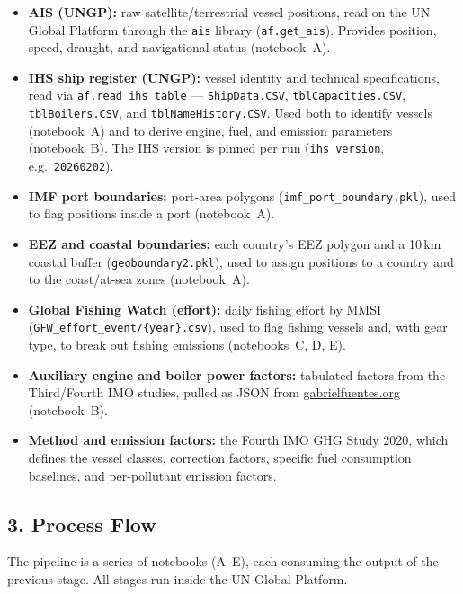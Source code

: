 \documentclass[
  11pt,
]{article}
\providecommand{\tightlist}{%
  \setlength{\itemsep}{0pt}\setlength{\parskip}{0pt}}
\begin{document}
\begin{itemize}
\tightlist
\item
  \textbf{AIS (UNGP):} raw satellite/terrestrial vessel positions, read
  on the UN Global Platform through the \texttt{ais} library
  (\texttt{af.get\_ais}). Provides position, speed, draught, and
  navigational status (notebook~A).
\item
  \textbf{IHS ship register (UNGP):} vessel identity and technical
  specifications, read via \texttt{af.read\_ihs\_table} ---
  \texttt{ShipData.CSV}, \texttt{tblCapacities.CSV},
  \texttt{tblBoilers.CSV}, and \texttt{tblNameHistory.CSV}. Used both to
  identify vessels (notebook~A) and to derive engine, fuel, and emission
  parameters (notebook~B). The IHS version is pinned per run
  (\texttt{ihs\_version}, e.g.\ \texttt{20260202}).
\item
  \textbf{IMF port boundaries:} port-area polygons
  (\texttt{imf\_port\_boundary.pkl}), used to flag positions inside a
  port (notebook~A).
\item
  \textbf{EEZ and coastal boundaries:} each country's EEZ polygon and a
  10\,km coastal buffer (\texttt{geoboundary2.pkl}), used to assign
  positions to a country and to the coast/at-sea zones (notebook~A).
\item
  \textbf{Global Fishing Watch (effort):} daily fishing effort by MMSI
  (\texttt{GFW\_effort\_event/\{year\}.csv}), used to flag fishing
  vessels and, with gear type, to break out fishing emissions
  (notebooks~C, D, E).
\item
  \textbf{Auxiliary engine and boiler power factors:} tabulated factors
  from the Third/Fourth IMO studies, pulled as JSON from
  \href{https://www.gabrielfuentes.org/tables_emissions/ae_ab_power.json}{gabrielfuentes.org}
  (notebook~B).
\item
  \textbf{Method and emission factors:} the Fourth IMO GHG Study 2020,
  which defines the vessel classes, correction factors, specific fuel
  consumption baselines, and per-pollutant emission factors.
\end{itemize}

\subsection{3. Process Flow}\label{process-flow}

The pipeline is a series of notebooks (A--E), each consuming the output
of the previous stage. All stages run inside the UN Global Platform.
\end{document}
